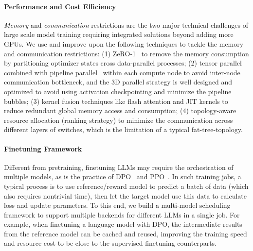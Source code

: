 \paragraph{Performance and Cost Efficiency} \textit{Memory} and \textit{communication} restrictions are the two major technical challenges of large scale model training requiring integrated solutions beyond adding more GPUs.
We use and improve upon the following techniques to tackle the memory and communication restrictions: (1) ZeRO-1~\cite{zero} to remove the memory consumption by partitioning optimizer states cross data-parallel processes; (2) tensor parallel combined with pipeline parallel~\cite{megatron-lm} within each compute node to avoid inter-node communication bottleneck, and the 3D parallel strategy is well designed and optimized to avoid using activation checkpointing and minimize the pipeline bubbles; (3) kernel fusion techniques like flash attention\cite{dao2022flashattention}\cite{dao2023flashattention2} and JIT kernels to reduce redundant global memory access and consumption; (4) topology-aware resource allocation (ranking strategy) to minimize the communication across different layers of switches, which is the limitation of a typical fat-tree-topology. 

\paragraph{Finetuning Framework}
Different from pretraining, finetuning LLMs may require the orchestration of multiple models, as is the practice of DPO~\citep{rafailov2023direct} and PPO~\citep{ouyang2022training}.
In such training jobs, a typical process is to use reference/reward model to predict a batch of data (which also requires nontrivial time), then let the target model use this data to calculate loss and update parameters. 
To this end, we build a multi-model scheduling framework to support multiple backends for different LLMs in a single job. For example, when finetuning a language model with DPO, the intermediate results from the reference model can be cached and reused, improving the training speed and resource cost to be close to the supervised finetuning counterparts. 







